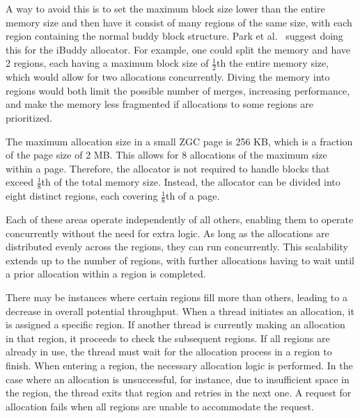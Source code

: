 A way to avoid this is to set the maximum block size lower than the entire memory size and then have it consist of many regions of the same size, with each region containing the normal buddy block structure. Park et al.~\cite{park2014ibuddy} suggest doing this for the iBuddy allocator. For example, one could split the memory and have 2 regions, each having a maximum block size of $\frac{1}{2}$th the entire memory size, which would allow for two allocations concurrently. Diving the memory into regions would both limit the possible number of merges, increasing performance, and make the memory less fragmented if allocations to some regions are prioritized.

The maximum allocation size in a small ZGC page is 256 KB, which is a fraction of the page size of 2 MB. This allows for 8 allocations of the maximum size within a page. Therefore, the allocator is not required to handle blocks that exceed $\frac{1}{8}$th of the total memory size. Instead, the allocator can be divided into eight distinct regions, each covering $\frac{1}{8}$th of a page.

Each of these areas operate independently of all others, enabling them to operate concurrently without the need for extra logic. As long as the allocations are distributed evenly across the regions, they can run concurrently. This scalability extends up to the number of regions, with further allocations having to wait until a prior allocation within a region is completed.

There may be instances where certain regions fill more than others, leading to a decrease in overall potential throughput. When a thread initiates an allocation, it is assigned a specific region. If another thread is currently making an allocation in that region, it proceeds to check the subsequent regions. If all regions are already in use, the thread must wait for the allocation process in a region to finish. When entering a region, the necessary allocation logic is performed. In the case where an allocation is unsuccessful, for instance, due to insufficient space in the region, the thread exits that region and retries in the next one. A request for allocation fails when all regions are unable to accommodate the request.

